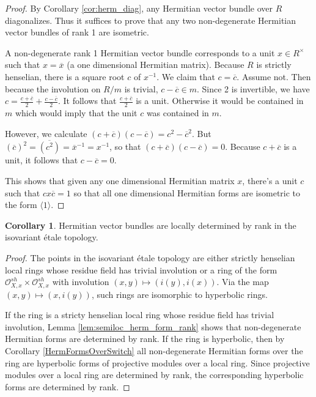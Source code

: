 \documentclass[edeposit,fullpage]{uiucthesis2009}
\newcommand{\mc}{\mathcal}
\theoremstyle{plain}
\numberwithin{lemma}{section}
\theoremstyle{definition}
\newtheorem{corollary}[lemma]{Corollary}
\begin{document}
\begin{proof}
By Corollary \ref{cor:herm_diag}, any Hermitian vector bundle over $R$
diagonalizes. Thus it suffices to prove that any two non-degenerate
Hermitian vector bundles of rank 1 are isometric. 

A non-degenerate rank 1 Hermitian vector bundle corresponds to a unit
$x \in R^\times$ such that $x = \overline x$ (a one dimensional
Hermitian matrix). Because $R$ is strictly henselian, there is a
square root $c$ of $x^{-1}$. We claim that $c = \overline c$. Assume
not. Then because the involution on $R/m$ is trivial, $c - \overline
c \in m$. Since 2 is invertible, we have $c = \frac{c + \overline
  c}{2} + \frac{c-\overline c}{2}$. It follows that $\frac{c+\overline
  c}{2}$ is a unit. Otherwise it would be contained in $m$ which would
imply that the unit $c$ was contained in $m$. 

However, we calculate $(c + \overline c)(c - \overline c) = c^2 -
\overline c^2$. But $(\overline c)^2 = \overline{(c^2)} = \overline x^{-1}
= x^{-1}$, so that $(c + \overline c)(c - \overline c) = 0$. Because $c +
\overline c$ is a unit, it follows that $c - \overline c = 0$. 

This shows that given any one dimensional Hermitian matrix $x$,
there's a unit $c$ such that $c x \overline c = 1$ so that all one
dimensional Hermitian forms are isometric to the form $\langle 1 \rangle$.
\end{proof}

\begin{corollary}\label{cor:loc_det_rank}
Hermitian vector bundles are locally determined by rank in the isovariant \'etale topology.
\end{corollary}

\begin{proof}
The points in the isovariant \'etale topology are either strictly
henselian local rings whose residue field has
trivial involution or a ring of the form $\mc O_{X,x}^{sh} \times \mc
O_{X,x}^{sh}$ with involution $(x,y) \mapsto (i(y),i(x))$. Via the map
$(x,y) \mapsto (x,i(y))$, such rings are isomorphic to hyperbolic
rings. 

If the ring is a stricty henselian local ring whose residue field has
trivial involution, Lemma \ref{lem:semiloc_herm_form_rank} shows that
non-degenerate Hermitian forms are determined by rank. If the
ring is hyperbolic, then by Corollary \ref{HermFormsOverSwitch}  all non-degenerate Hermitian forms over the
ring are hyperbolic forms of projective modules over a local
ring. Since projective modules over a local ring are determined by
rank, the corresponding hyperbolic forms are determined by rank. 
\end{proof}
\end{document}
